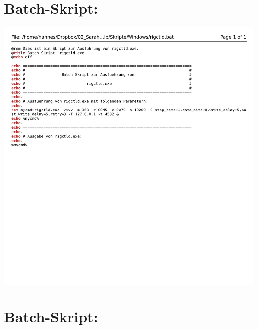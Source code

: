 
\appendix

\chapter{Batch-Skript: }
\label{chap:rigctldbat}

\begin{center}
	\includegraphics[width=1\textwidth]{./appendicies/rigctld-windows}
\end{center}


\chapter{Batch-Skript: }
\label{chap:rotctldbat}

